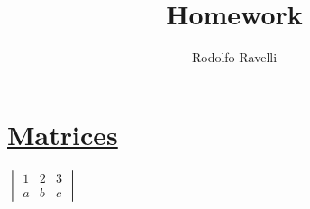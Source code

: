 \documentclass[12pt]{article}
\title{Homework}
\author{Rodolfo Ravelli}
\begin{document}
\maketitle
{}
\section*{\centering \underline{Matrices}}

\vspace*{5mm}
\begin{center}
{\huge
$\begin{vmatrix}
1 & 2 & 3\\
a & b & c
\end{vmatrix}$
}

\end{center}
\end{document}
